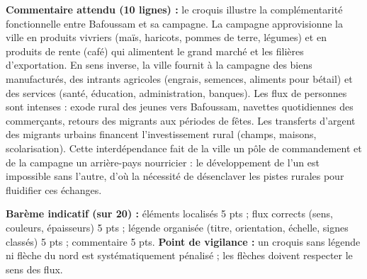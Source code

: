 \documentclass[11pt]{article}
\begin{document}
\begin{corrige}
\textbf{Commentaire attendu (10 lignes) :} le croquis illustre la complémentarité fonctionnelle entre Bafoussam et sa campagne. La campagne approvisionne la ville en produits vivriers (maïs, haricots, pommes de terre, légumes) et en produits de rente (café) qui alimentent le grand marché et les filières d'exportation. En sens inverse, la ville fournit à la campagne des biens manufacturés, des intrants agricoles (engrais, semences, aliments pour bétail) et des services (santé, éducation, administration, banques). Les flux de personnes sont intenses : exode rural des jeunes vers Bafoussam, navettes quotidiennes des commerçants, retours des migrants aux périodes de fêtes. Les transferts d'argent des migrants urbains financent l'investissement rural (champs, maisons, scolarisation). Cette interdépendance fait de la ville un pôle de commandement et de la campagne un arrière-pays nourricier : le développement de l'un est impossible sans l'autre, d'où la nécessité de désenclaver les pistes rurales pour fluidifier ces échanges.

\textbf{Barème indicatif (sur 20) :} éléments localisés 5 pts ; flux corrects (sens, couleurs, épaisseurs) 5 pts ; légende organisée (titre, orientation, échelle, signes classés) 5 pts ; commentaire 5 pts. \textbf{Point de vigilance :} un croquis sans légende ni flèche du nord est systématiquement pénalisé ; les flèches doivent respecter le sens des flux.
\end{corrige}
\end{document}

